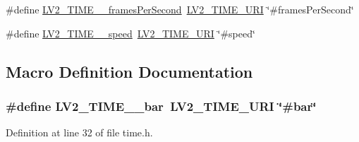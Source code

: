 \begin{DoxyCompactItemize}
\item 
\#define \hyperlink{lib-src_2lv2_2lv2_2lv2_2lv2plug_8in_2ns_2ext_2time_2time_8h_a214cd5b82bff723b9d501a9a11eef049}{L\+V2\+\_\+\+T\+I\+M\+E\+\_\+\+\_\+frames\+Per\+Second}~\hyperlink{lib-src_2lv2_2lv2_2lv2_2lv2plug_8in_2ns_2ext_2time_2time_8h_a3e4c1464d76481b52787ab634283fa3b}{L\+V2\+\_\+\+T\+I\+M\+E\+\_\+\+U\+RI} \char`\"{}\#frames\+Per\+Second\char`\"{}
\item 
\#define \hyperlink{lib-src_2lv2_2lv2_2lv2_2lv2plug_8in_2ns_2ext_2time_2time_8h_aa8776f581fe5cdb2f6768dc73b790fc0}{L\+V2\+\_\+\+T\+I\+M\+E\+\_\+\+\_\+speed}~\hyperlink{lib-src_2lv2_2lv2_2lv2_2lv2plug_8in_2ns_2ext_2time_2time_8h_a3e4c1464d76481b52787ab634283fa3b}{L\+V2\+\_\+\+T\+I\+M\+E\+\_\+\+U\+RI} \char`\"{}\#speed\char`\"{}
\end{DoxyCompactItemize}


\subsection{Macro Definition Documentation}
\subsubsection[{\texorpdfstring{L\+V2\+\_\+\+T\+I\+M\+E\+\_\+\+\_\+bar}{LV2_TIME__bar}}]{\setlength{\rightskip}{0pt plus 5cm}\#define L\+V2\+\_\+\+T\+I\+M\+E\+\_\+\+\_\+bar~{\bf L\+V2\+\_\+\+T\+I\+M\+E\+\_\+\+U\+RI} \char`\"{}\#bar\char`\"{}}\hypertarget{lib-src_2lv2_2lv2_2lv2_2lv2plug_8in_2ns_2ext_2time_2time_8h_ad33e1ccabe8d4658bef8bf6428e64f96}{}\label{lib-src_2lv2_2lv2_2lv2_2lv2plug_8in_2ns_2ext_2time_2time_8h_ad33e1ccabe8d4658bef8bf6428e64f96}


Definition at line 32 of file time.\+h.

